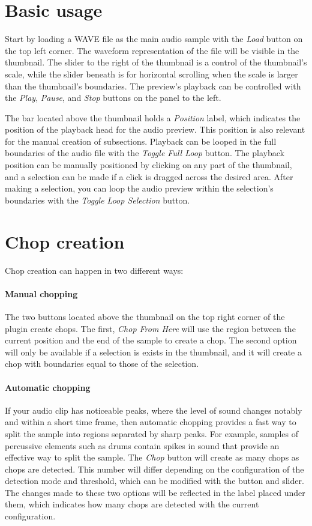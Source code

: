 \documentclass[12pt, a4paper, hidelinks]{report}
\begin{document}
	\section{Basic usage}   
	Start by loading a WAVE file as the main audio sample with the \textit{Load} button on the top left corner. The waveform representation of the file will be visible in the thumbnail. The slider to the right of the thumbnail is a control of the thumbnail's scale, while the slider beneath is for horizontal scrolling when the scale is larger than the thumbnail's boundaries. The preview's playback can be controlled with the \textit{Play}, \textit{Pause}, and \textit{Stop} buttons on the panel to the left. \par 
	The bar located above the thumbnail holds a \textit{Position} label, which indicates the position of the playback head for the audio preview. This position is also relevant for the manual creation of subsections. Playback can be looped in the full boundaries of the audio file with the \textit{Toggle Full Loop} button. The playback position can be manually positioned by clicking on any part of the thumbnail, and a selection can be made if a click is dragged across the desired area. After making a selection, you can loop the audio preview within the selection's boundaries with the \textit{Toggle Loop Selection} button. \par
	
	\section{Chop creation}
	Chop creation can happen in two different ways:
	\paragraph{Manual chopping\\}
	The two buttons located above the thumbnail on the top right corner of the plugin create chops. The first, \textit{Chop From Here} will use the region between the current position and the end of the sample to create a chop. The second option will only be available if a selection is exists in the thumbnail, and it will create a chop with boundaries equal to those of the selection.
	\paragraph{Automatic chopping\\}
	If your audio clip has noticeable peaks, where the level of sound changes notably and within a short time frame, then automatic chopping provides a fast way to split the sample into regions separated by sharp peaks. For example, samples of percussive elements such as drums contain spikes in sound that provide an effective way  to split the sample. The \textit{Chop} button will create as many chops as chops are detected. This number will differ depending on the configuration of the detection mode and threshold, which can be modified with the button and slider. The changes made to these two options will be reflected in the label placed under them, which indicates how many chops are detected with the current configuration.\par
	
\end{document}
